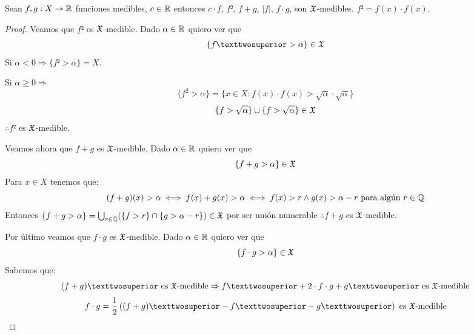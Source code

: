 \begin{lemma}
    Sean $f, g: X \to \mathbb{R}$ funciones medibles, $c \in \mathbb{R}$ entonces $c \cdot f$, $f²$, $f + g$, $|f|$, $f \cdot g$, son $\mathfrak{X}$-medibles.
    $f² = f(x) \cdot f(x)$.
    \begin{proof}
        Veamos que $f²$ es $\mathfrak{X}$-medible. Dado $\alpha \in \mathbb{R}$ quiero ver que \begin{equation*}
            \{ f² > \alpha \} \in \mf{X}
        \end{equation*}
        Si $\alpha < 0 \Rightarrow \{ f² > \alpha \} = X$.

        Si $\alpha \geq 0 \Rightarrow$
        \begin{equation*}
            \{ f^2 > \alpha \} = \{ x \in X : f(x) \cdot f(x) > \sqrt{\alpha} \cdot \sqrt{\alpha} \}
        \end{equation*}
        \begin{equation*}
            \{ f > \sqrt{\alpha} \} \cup \{ f > \sqrt{\alpha} \} \in \mathfrak{X}
        \end{equation*} $\therefore f²$ es $\mathfrak{X}$-medible.

        Veamos ahora que $f + g$ es $\mathfrak{X}$-medible. Dado $\alpha \in \mathbb{R}$ quiero ver que \begin{equation*}
            \{ f + g > \alpha \} \in \mathfrak{X}
        \end{equation*}
        Para $x \in X$ tenemos que: \begin{equation*}
            (f+g)(x) > \alpha \iff f(x) + g(x) > \alpha \iff f(x) > r \land g(x) > \alpha - r \text{ para algún } r \in \mathbb{Q}
        \end{equation*}
        Entonces $\{ f + g > \alpha \} = \bigcup_{r \in \mathbb{Q}} (\{ f > r \} \cap \{ g > \alpha - r \}) \in \mathfrak{X}$ por ser unión numerable $\therefore f+g$ es $\mathfrak{X}$-medible.

        Por último veamos que $f \cdot g$ es $\mathfrak{X}$-medible. Dado $\alpha \in \mathbb{R}$ quiero ver que \begin{equation*}
            \{ f \cdot g > \alpha \} \in \mathfrak{X}
        \end{equation*}
        Sabemos que:
        \begin{equation*}
            (f+g)² \text{ es } \mf{X} \text{-medible} \Rightarrow f² + 2 \cdot f \cdot g + g² \text{ es } \mf{X} \text{-medible}
        \end{equation*}
        \begin{equation*}
            f \cdot g = \frac{1}{2} \left( (f+g)² - f² - g² \right) \text{ es } \mf{X} \text{-medible}
        \end{equation*}
    \end{proof}
\end{lemma}

